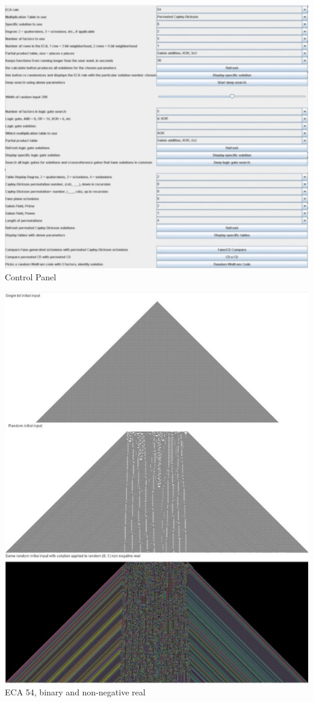 \documentclass[11pt]{article}
\begin{document}
\begin{center}

\includegraphics{ControlPanelSmall.jpg}
Control Panel

\includegraphics{FiftyFourSmall.jpg}
ECA 54, binary and non-negative real


\end{center}
\end{document}
